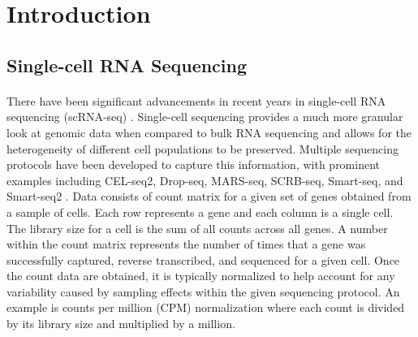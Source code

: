 \documentclass[
12pt, %
letterpaper, %
oneside, %
headinclude,footinclude, %
BCOR5mm, %
]{scrartcl}
\begin{document}
\let\thefootnote\relax{}



\newpage

\setcounter{tocdepth}{2} %

\tableofcontents %

\listoftables %

\listoffigures %

\newpage %


\section{Introduction}

\subsection{Single-cell RNA Sequencing}

\paragraph*{}
There have been significant advancements in recent years in single-cell RNA sequencing (scRNA-seq) \citep{luecken2019current}. Single-cell sequencing provides a much more granular look at genomic data when compared to bulk RNA sequencing and allows for the heterogeneity of different cell populations to be preserved.
Multiple sequencing protocols have been developed to capture this information, with prominent examples including CEL-seq2, Drop-seq, MARS-seq, SCRB-seq, Smart-seq, and Smart-seq2 \citet{ziegenhain2017comparative}.
Data consists of count matrix for a given set of genes obtained from a sample of cells. Each row represents a gene and each column is a single cell. The library size for a cell is the sum of all counts across all genes. 
A number within the count matrix represents the number of times that a gene was successfully captured, reverse transcribed, and sequenced for a given cell.
Once the count data are obtained, it is typically normalized to help account for any variability caused by sampling effects within the given sequencing protocol.
An example is counts per million (CPM) normalization where each count is divided by its library size and multiplied by a million.
\end{document}
